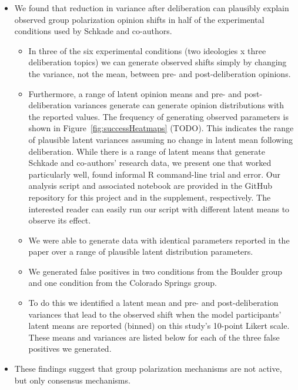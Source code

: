 \documentclass[11pt,letterpaper]{article}
\begin{document}
\begin{itemize}
  \item
    We found that reduction in variance after deliberation can plausibly explain observed
    group polarization opinion shifts in half of the experimental conditions
    used by Schkade and co-authors.
    \begin{itemize}
      \item 
        In three of the six experimental conditions (two ideologies x three
        deliberation topics) we can generate observed shifts simply by changing
        the variance, not the mean, between pre- and post-deliberation 
        opinions. 
      \item
        Furthermore, a range of latent opinion means and pre- and post-deliberation
        variances generate can generate opinion distributions with the reported
        values. The frequency of generating observed parameters is shown in 
        Figure~\ref{fig:successHeatmaps} (TODO). This indicates the range of plausible
        latent variances assuming no change in latent mean following deliberation.
        While there is a range of latent means that generate Schkade and 
        co-authors' research data, we present one that worked particularly
        well, found informal R command-line trial and error. Our analysis script and 
        associated notebook are provided in the GitHub repository for this
        project and in the supplement, respectively. The interested reader can
        easily run our script with different latent means to observe its effect.
      \item
        We were able to generate data with identical parameters reported in
        the paper over a range of plausible latent distribution parameters. 
      \item
        We generated false positives in 
        two conditions from the
        Boulder group and one condition from the Colorado Springs group.
      \item
        To do this we identified a latent mean
        and pre- and post-deliberation variances that lead to the observed
        shift when the model participants' latent means are reported (binned)
        on this study's 10-point Likert scale. These means and variances are
        listed below for each of the three false positives we generated.
    \end{itemize}
  \item 
    These findings suggest that group polarization mechanisms are not active,
    but only consensus mechanisms.

\end{itemize}
\end{document}
